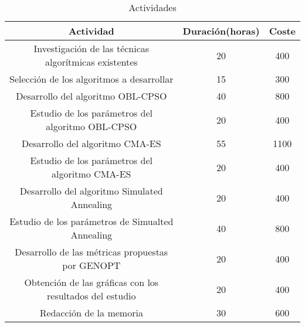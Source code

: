 \begin{table}[h]
    \begin{tabular}{|c|c|c|}
    \hline
    Actividad                                                & Duración(horas) & Coste    \\ \hline
    Investigación de las técnicas algorítmicas existentes    & 20              & 400      \\ \hline
    Selección de los algoritmos a desarrollar                & 15               & 300      \\ \hline
    Desarrollo del algoritmo OBL-CPSO                        & 40              & 800      \\ \hline
    Estudio de los parámetros del algoritmo OBL-CPSO         & 20              & 400      \\ \hline
    Desarrollo del algoritmo CMA-ES                          & 55              & 1100     \\ \hline
    Estudio de los parámetros del algoritmo CMA-ES           & 20              & 400      \\ \hline
    Desarrollo del algoritmo Simulated Annealing             & 20              & 400      \\ \hline
    Estudio de los parámetros de Simualted Annealing         & 40              & 800      \\ \hline
    Desarrollo de las métricas propuestas por GENOPT         & 20              & 400      \\ \hline
    Obtención de las gráficas con los resultados del estudio & 20              & 400      \\ \hline
    Redacción de la memoria                                  & 30              & 600      \\ \hline
    \end{tabular}
    \caption {Actividades}
\end{table}
